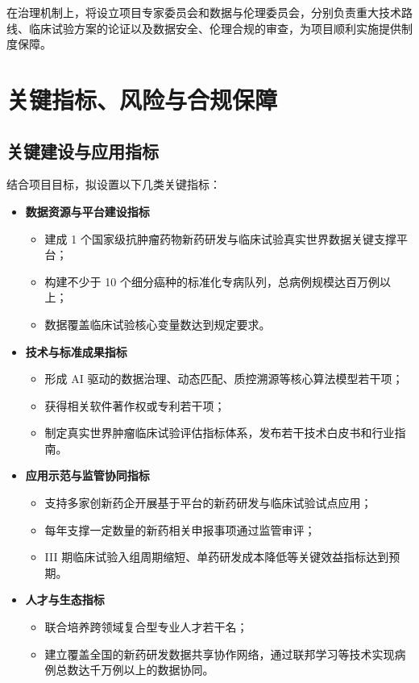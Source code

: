 \documentclass[12pt, a4paper, fontset=mac]{ctexart} %
\begin{document}
在治理机制上，将设立项目专家委员会和数据与伦理委员会，分别负责重大技术路线、临床试验方案的论证以及数据安全、伦理合规的审查，为项目顺利实施提供制度保障。

\section{关键指标、风险与合规保障}

\subsection{关键建设与应用指标}

结合项目目标，拟设置以下几类关键指标：

\begin{itemize}
  \item \textbf{数据资源与平台建设指标}
    \begin{itemize}
      \item 建成 1 个国家级抗肿瘤药物新药研发与临床试验真实世界数据关键支撑平台；
      \item 构建不少于 10 个细分癌种的标准化专病队列，总病例规模达百万例以上；
      \item 数据覆盖临床试验核心变量数达到规定要求。
    \end{itemize}
  \item \textbf{技术与标准成果指标}
    \begin{itemize}
      \item 形成 AI 驱动的数据治理、动态匹配、质控溯源等核心算法模型若干项；
      \item 获得相关软件著作权或专利若干项；
      \item 制定真实世界肿瘤临床试验评估指标体系，发布若干技术白皮书和行业指南。
    \end{itemize}
  \item \textbf{应用示范与监管协同指标}
    \begin{itemize}
      \item 支持多家创新药企开展基于平台的新药研发与临床试验试点应用；
      \item 每年支撑一定数量的新药相关申报事项通过监管审评；
      \item III 期临床试验入组周期缩短、单药研发成本降低等关键效益指标达到预期。
    \end{itemize}
  \item \textbf{人才与生态指标}
    \begin{itemize}
      \item 联合培养跨领域复合型专业人才若干名；
      \item 建立覆盖全国的新药研发数据共享协作网络，通过联邦学习等技术实现病例总数达千万例以上的数据协同。
    \end{itemize}
\end{itemize}
\end{document}
